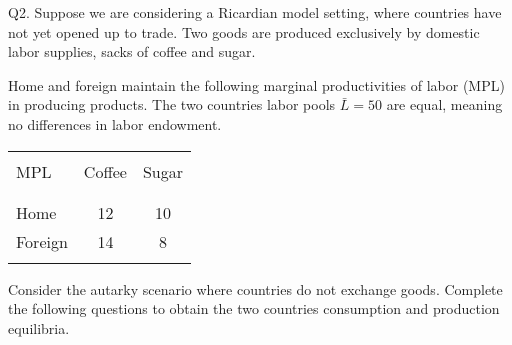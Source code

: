 \documentclass[12pt]{article}
\begin{document}
\noindent Q2. Suppose we are considering a Ricardian model setting, where countries have not yet opened up to trade.
Two goods are produced exclusively by domestic labor supplies, sacks of coffee and sugar. 

\noindent Home and foreign maintain the following marginal productivities of labor (MPL) in producing products. The two countries labor pools $\bar{L}=50$ are equal, meaning no differences in labor endowment.

\begin{table}[!h]
	\centering
	\begin{tabular}[t]{l c c }
		\hline
		&&\\
		MPL & Coffee & Sugar  \\
		&&\\
		\hline
		&&\\
		Home & 12 & 10  \\
		Foreign & 14 & 8 \\
		&&\\
		\hline
	\end{tabular}
\end{table}



Consider the autarky scenario where countries do not exchange goods. Complete the following questions to obtain the two countries consumption and production equilibria. 
\end{document}
